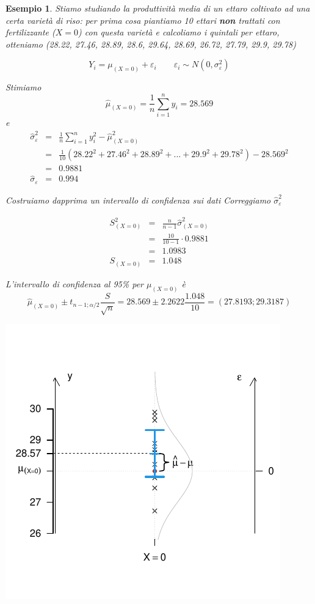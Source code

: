 \documentclass[
  11pt,
]{book}
\theoremstyle{mytheoremstyle}
\theoremstyle{mydefstyle}
\newtheorem{example}{{Esempio}}[section]
\begin{document}
\begin{example}
Stiamo studiando la produttività media di un ettaro coltivato ad una certa varietà di riso:
per prima cosa piantiamo 10 ettari \textbf{non} trattati con fertilizzante (\(X=0\)) con questa varietà e calcoliamo i quintali per ettaro, otteniamo (28.22, 27.46, 28.89, 28.6, 29.64, 28.69, 26.72, 27.79, 29.9, 29.78)

\[Y_i=\mu_{(X=0)}+\varepsilon_i\qquad\varepsilon_i\sim N(0,\sigma_\varepsilon^2)\]

Stimiamo
\[\hat\mu_{(X=0)}=\frac 1 n\sum_{i=1}^n y_i=28.569\]
e
\begin{eqnarray*}
\hat\sigma_\varepsilon^2&=&\frac 1 n\sum_{i=1}^n y_i^2-\hat\mu_{(X=0)}^2\\
&=&\frac 1 {10}(28.22^2+27.46^2+28.89^2 +...+ 29.9^2+29.78^2)-28.569^2\\
&=&0.9881\\
\hat\sigma_\varepsilon &=& 0.994
\end{eqnarray*}

Costruiamo dapprima un intervallo di confidenza sui dati
Correggiamo \(\hat\sigma_\varepsilon^2\)

\begin{eqnarray*}
S_{(X=0)}^2&=&\frac{n}{n-1}\hat\sigma_{(X=0)}^2\\
&=&\frac{10}{10-1}\cdot0.9881\\
&=&1.0983\\
S_{(X=0)}&=&1.048
\end{eqnarray*}

L'intervallo di confidenza al 95\% per \(\mu_{(X=0)}\) è
\[\hat\mu_{(X=0)}\pm t_{n-1;\alpha/2}\frac S{\sqrt n}=28.569\pm 2.2622\frac{1.048}{10}=
(27.8193;29.3187)\]

\begin{center}\includegraphics{Appunti_di_Statistica_2025_files/figure-latex/17-regressione-I-8-1} \end{center}


\end{example}
\end{document}
